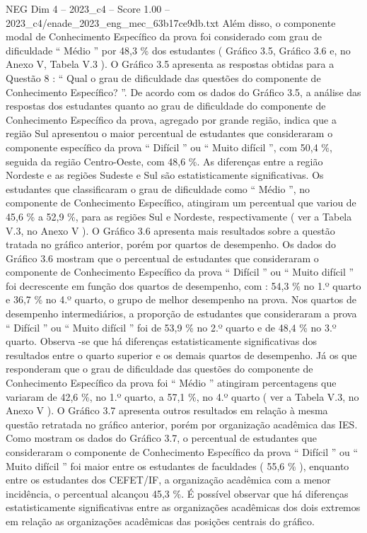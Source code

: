 \begin{textsample}{NEG Dim 4 – 2023\_c4 – Score 1.00 – 2023\_c4/enade\_2023\_eng\_mec\_63b17ce9db.txt}
Além disso, o componente modal de Conhecimento Específico da prova foi considerado com grau de dificuldade “ Médio ” por 48,3 \% dos estudantes ( Gráfico 3.5, Gráfico 3.6 e, no Anexo V, Tabela V.3 ).
O Gráfico 3.5 apresenta as respostas obtidas para a Questão 8 : “ Qual o grau de dificuldade das questões do componente de Conhecimento Específico? ”.
De acordo com os dados do Gráfico 3.5, a análise das respostas dos estudantes quanto ao grau de dificuldade do componente de Conhecimento Específico da prova, agregado por grande região, indica que a região Sul apresentou o maior percentual de estudantes que consideraram o componente específico da prova “ Difícil ” ou “ Muito difícil ”, com 50,4 \%, seguida da região Centro-Oeste, com 48,6 \%.
As diferenças entre a região Nordeste e as regiões Sudeste e Sul são estatisticamente significativas.
Os estudantes que classificaram o grau de dificuldade como “ Médio ”, no componente de Conhecimento Específico, atingiram um percentual que variou de 45,6 \% a 52,9 \%, para as regiões Sul e Nordeste, respectivamente ( ver a Tabela V.3, no Anexo V ).
O Gráfico 3.6 apresenta mais resultados sobre a questão tratada no gráfico anterior, porém por quartos de desempenho.
Os dados do Gráfico 3.6 mostram que o percentual de estudantes que consideraram o componente de Conhecimento Específico da prova “ Difícil ” ou “ Muito difícil ” foi decrescente em função dos quartos de desempenho, com : 54,3 \% no 1.º quarto e 36,7 \% no 4.º quarto, o grupo de melhor desempenho na prova.
Nos quartos de desempenho intermediários, a proporção de estudantes que consideraram a prova “ Difícil ” ou “ Muito difícil ” foi de 53,9 \% no 2.º quarto e de 48,4 \% no 3.º quarto.
Observa -se que há diferenças estatisticamente significativas dos resultados entre o quarto superior e os demais quartos de desempenho.
Já os que responderam que o grau de dificuldade das questões do componente de Conhecimento Específico da prova foi “ Médio ” atingiram percentagens que variaram de 42,6 \%, no 1.º quarto, a 57,1 \%, no 4.º quarto ( ver a Tabela V.3, no Anexo V ).
O Gráfico 3.7 apresenta outros resultados em relação à mesma questão retratada no gráfico anterior, porém por organização acadêmica das IES.
Como mostram os dados do Gráfico 3.7, o percentual de estudantes que consideraram o componente de Conhecimento Específico da prova “ Difícil ” ou “ Muito difícil ” foi maior entre os estudantes de faculdades ( 55,6 \% ), enquanto entre os estudantes dos CEFET/IF, a organização acadêmica com a menor incidência, o percentual alcançou 45,3 \%.
É possível observar que há diferenças estatisticamente significativas entre as organizações acadêmicas dos dois extremos em relação as organizações acadêmicas das posições centrais do gráfico.

\end{textsample}
